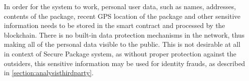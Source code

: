 In order for the system to work, personal user data, such as names, addresses, contents of the package, recent GPS location of the package and other sensitive information needs to be stored in the smart contract and processed by the blockchain. There is no built-in data protection mechanisms in the network, thus making all of the personal data visible to the public. This is not desirable at all in context of Secure Package system, as without proper protection against the outsiders, this sensitive information may be used for identity frauds, as described in \ref{section:analysisthirdparty}.



